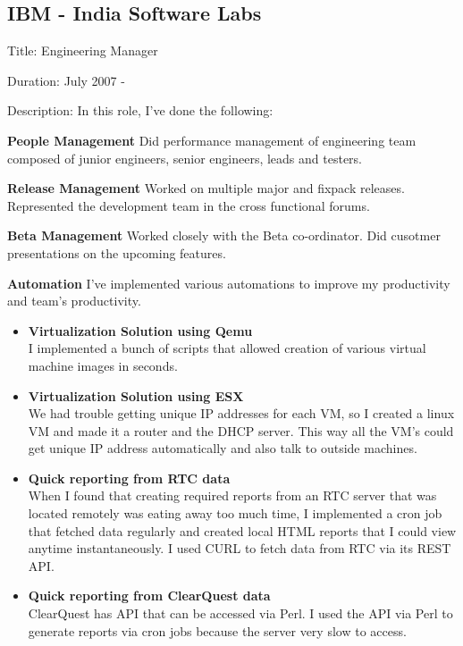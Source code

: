 \documentclass [a4paper,11pt] {article}
\begin{document}
\subsection*{IBM - India Software Labs}
\begin{description}
\item{Title:} Engineering Manager
\item{Duration:} July 2007 -
\item{Description:} In this role, I've done the following:
	    \begin{description}
	    \item{\bf People Management} Did performance management of engineering team composed of junior engineers, senior engineers, leads and testers.
	    \item{\bf Release Management} Worked on multiple major and fixpack releases. Represented the development team in the cross functional forums.
	    \item{\bf Beta Management} Worked closely with the Beta co-ordinator. Did cusotmer presentations on the upcoming features.
	    \item{\bf Automation} I've implemented various automations to improve my productivity and team's productivity.
	    	\begin{itemize}
		\item{\bf Virtualization Solution using Qemu}\\I implemented a bunch of scripts that allowed creation of various virtual machine images in seconds.
		\item{\bf Virtualization Solution using ESX}\\We had trouble
		getting unique IP addresses for each VM, so I created a linux
		VM and made it a router and the DHCP server. This way all the
		VM's could get unique IP address automatically and also talk to
		outside machines. 
		\item{\bf Quick reporting from RTC data}\\
		When I found that creating required reports from an RTC server
		that was located remotely was eating away too much time, I
		implemented a cron job that fetched data regularly and created
		local HTML reports that I could view anytime instantaneously. I
		used CURL to fetch data from RTC via its REST API.
		\item{\bf Quick reporting from ClearQuest data}\\
			ClearQuest has API that can be accessed via Perl. I
			used the API via Perl to generate reports via cron jobs
			because the server very slow to access.
		\end{itemize}
	    \end{description}

\end{description}
\end{document}

